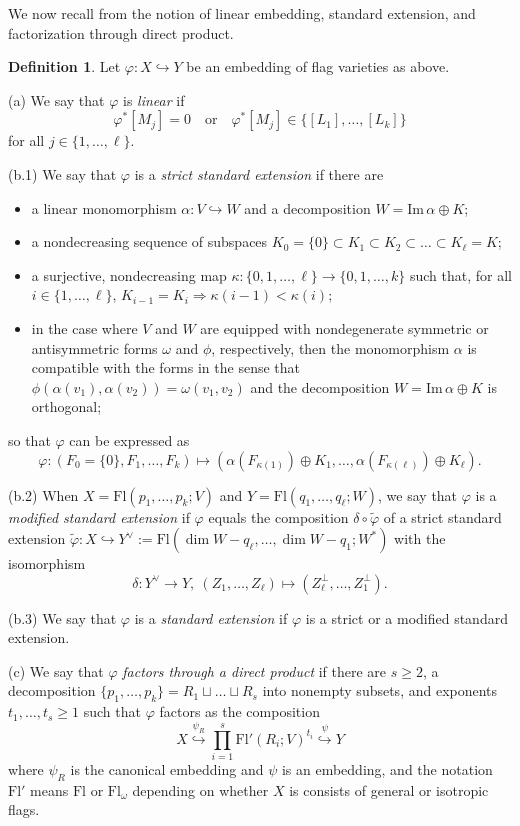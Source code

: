 \documentclass[12pt]{amsart}
\newcommand{\Flags}{\mathrm{Fl}}
\theoremstyle{definition}
\newtheorem{definition}[theorem]{Definition}
\begin{document}
We now recall from \cite{PT} the notion of linear embedding, standard extension, and factorization through direct product.

\begin{definition}
\label{D-linear}
Let $\varphi:X\hookrightarrow Y$ be an embedding of flag varieties
as above.

(a) We say that $\varphi$
is {\em linear} if 
\[\varphi^*[M_j]=0\quad\mbox{or}\quad\varphi^*[M_j]\in\{[L_1],\ldots,[L_{k}]\}\]
for all $j\in\{1,\ldots,\ell\}$. 

(b.1) We say that $\varphi$ is a {\em strict standard extension} if there are 
\begin{itemize}
\item a linear monomorphism $\alpha:V\hookrightarrow W$ and a decomposition $W=\mathrm{Im}\,\alpha\oplus K$;
\item a nondecreasing sequence of subspaces $K_0=\{0\}\subset K_1\subset K_2\subset\ldots\subset K_\ell=K$;
\item a surjective, nondecreasing map $\kappa:\{0,1,\ldots,\ell\}\to\{0,1,\ldots,k\}$ such that, for all $i\in\{1,\ldots,\ell\}$, $K_{i-1}= K_i\Rightarrow\kappa(i-1)<\kappa(i)$;
\item in the case where $V$ and $W$ are equipped with nondegenerate symmetric or antisymmetric forms $\omega$ and $\phi$, respectively, then the monomorphism $\alpha$ is compatible with the forms in the sense that $\phi(\alpha(v_1),\alpha(v_2))=\omega(v_1,v_2)$ and the decomposition $W=\mathrm{Im}\,\alpha\oplus K$ is orthogonal;
\end{itemize}
so that $\varphi$ can be expressed as
\[\varphi:(F_0=\{0\},F_1,\ldots,F_k)\mapsto (\alpha(F_{\kappa(1)})\oplus K_1,\ldots,\alpha(F_{\kappa(\ell)})\oplus K_\ell).\] 

(b.2) When $X=\Flags(p_1,\ldots,p_k;V)$ and $Y=\Flags(q_1,\ldots,q_\ell;W)$, we say that $\varphi$ is a {\em modified standard extension} if $\varphi$ equals the composition $\delta\circ\tilde\varphi$ of a strict standard extension $\tilde\varphi:X\hookrightarrow Y^\vee:=\mathrm{Fl}(\dim W-q_\ell,\ldots,\dim W-q_1;W^*)$ with the isomorphism
\[\delta:Y^\vee\to Y,\ (Z_1,\ldots,Z_\ell)\mapsto (Z_{\ell}^\perp,\ldots,Z_1^\perp).\]

(b.3) We say that $\varphi$ is a {\em standard extension} if $\varphi$ is a strict or a modified standard extension.

(c) We say that $\varphi$ \textit{factors through a direct product} if there are $s\geq 2$, a decomposition 
$\{p_1,\ldots,p_{k}\}=R_1\sqcup\ldots\sqcup R_s$ into nonempty subsets, and exponents $t_1,\ldots,t_s\geq 1$ such that $\varphi$ factors as the composition
\[
X\stackrel{\psi_R}{\hookrightarrow } \prod_{i=1}^s\Flags'(R_i;V)^{t_i}\stackrel{\psi}{\hookrightarrow} Y
\]
where $\psi_R$ is the canonical embedding
and $\psi$ is an embedding, and the notation $\Flags'$ means $\Flags$ or $\Flags_\omega$ depending on whether $X$ is consists of general or isotropic flags.


\end{definition}
\end{document}
